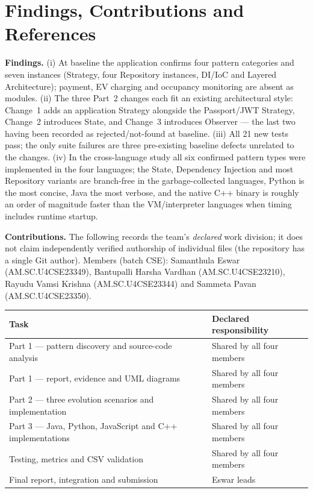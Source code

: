 \documentclass[11pt,a4paper]{article}
\begin{document}
\section{Findings, Contributions and References}
\begin{sloppypar}
\textbf{Findings.} (i) At baseline the application confirms four pattern
categories and seven instances (Strategy, four Repository instances, DI/IoC and
Layered Architecture); payment, EV charging and occupancy monitoring are absent
as modules. (ii) The three Part~2 changes each fit an existing architectural
style: Change~1 adds an application Strategy alongside the Passport/JWT Strategy,
Change~2 introduces State, and Change~3 introduces Observer --- the last two
having been recorded as rejected/not-found at baseline. (iii) All 21 new tests
pass; the only suite failures are three pre-existing baseline defects unrelated
to the changes. (iv) In the cross-language study all six confirmed pattern types
were implemented in the four languages; the State, Dependency Injection and most
Repository variants are branch-free in the garbage-collected languages, Python is
the most concise, Java the most verbose, and the native C++ binary is roughly an
order of magnitude faster than the VM/interpreter languages when timing includes
runtime startup.
\end{sloppypar}

\begin{sloppypar}
\noindent\textbf{Contributions.} The following records the team's \emph{declared}
work division; it does not claim independently verified authorship of individual
files (the repository has a single Git author). Members (batch CSE): Samanthula
Eswar (AM.SC.U4CSE23349), Bantupalli Harsha Vardhan (AM.SC.U4CSE23210), Rayudu
Vamsi Krishna (AM.SC.U4CSE23344) and Sammeta Pavan (AM.SC.U4CSE23350).
\end{sloppypar}

\begin{center}
\small
\begin{tabular}{@{}p{} p{}@{}}
\toprule
Task & Declared responsibility \\
\midrule
Part 1 --- pattern discovery and source-code analysis & Shared by all four members \\
Part 1 --- report, evidence and UML diagrams & Shared by all four members \\
Part 2 --- three evolution scenarios and implementation & Shared by all four members \\
Part 3 --- Java, Python, JavaScript and C++ implementations & Shared by all four members \\
Testing, metrics and CSV validation & Shared by all four members \\
Final report, integration and submission & Eswar leads \\
\bottomrule
\end{tabular}
\end{center}
\end{document}
